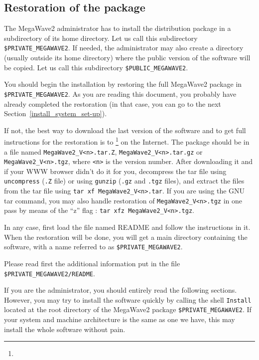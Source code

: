 \subsection{Restoration of the package}
\label{install_system_restoration}

The MegaWave2 administrator has to install the distribution package in a subdirectory of its home directory.
Let us call this subdirectory \verb+$PRIVATE_MEGAWAVE2+.
If needed, the administrator may also create a directory (usually outside its home directory) where
the public version of the software will be copied. 
Let us call this subdirectory \verb+$PUBLIC_MEGAWAVE2+.

You should begin the installation by restoring the full MegaWave2 package in \verb+$PRIVATE_MEGAWAVE2+. 
As you are reading this document, you probably have already completed the restoration (in that
case, you can go to the next Section~\ref{install_system_set-up}).

If not, the best way to download the last version of the software and to get
full instructions for the restoration is to 
\footnote{\httpmw} on the Internet.
The package should be in a file named \verb+MegaWave2_V<n>.tar.Z+,  
\verb+MegaWave2_V<n>.tar.gz+ or \verb+MegaWave2_V<n>.tgz+, where \verb+<n>+ is the version number.
After downloading it and if your WWW browser didn't do it for you, decompress the tar file using 
\verb+uncompress+ (\verb+.Z+ file) or using \verb+gunzip+ (\verb+.gz+ and \verb+.tgz+ files), and extract the
files from the tar file using \verb+tar xf MegaWave2_V<n>.tar+.
If you are using the GNU tar command, you may also handle restoration of \verb+MegaWave2_V<n>.tgz+
in one pass by means of the ``z'' flag : \verb+tar xfz MegaWave2_V<n>.tgz+.

In any case, first load the file named README and follow the instructions in it. 
When the restoration will be done, you will get a main directory containing the software,
with a name referred to as \verb+$PRIVATE_MEGAWAVE2+.

Please read first the additional information put in the file \verb+$PRIVATE_MEGAWAVE2/README+.

If you are the administrator, you should entirely read the following sections. However, you may try to
install the software quickly by calling the shell \verb+Install+ located at the root directory
of the MegaWave2 package \verb+$PRIVATE_MEGAWAVE2+. If your system and machine architecture is the same
as one we have, this may install the whole software without pain.

